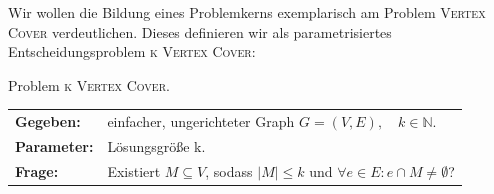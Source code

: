 \documentclass[a4paper,ngerman]{atseminar}
\newcommand{\N}{\ensuremath{\mathbb{N}}\xspace}
\begin{document}
\noindent
Wir wollen die Bildung eines Problemkerns exemplarisch am Problem \textsc{Vertex Cover} verdeutlichen. Dieses definieren wir als
parametrisiertes Entscheidungsproblem \textsc{k Vertex Cover}:

\begin{definition}{Problem \textsc{k Vertex Cover}.}
  \\
  \begin{tabular}{ll}
    \textbf{Gegeben:} & einfacher, ungerichteter Graph  $G = (V, E), \quad k \in \N$. \\
    \textbf{Parameter:} & Lösungsgröße k. \\
    \textbf{Frage:} & Existiert $M \subseteq V$, sodass $ |M| \leq k $ und $ \forall e \in E : e \cap M \neq \emptyset$?
  \end{tabular}
\end{definition}
\end{document}
